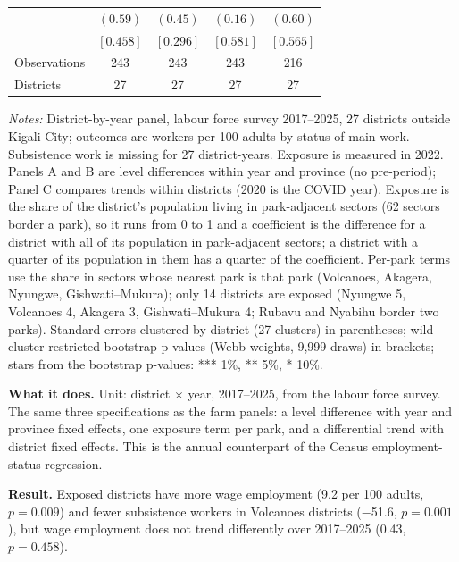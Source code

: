 \documentclass[11pt]{article}
\begin{document}
\begin{table}[H]
\begin{tabular}{lcccc}
 & $(0.59)$ & $(0.45)$ & $(0.16)$ & $(0.60)$ \\
 & $[0.458]$ & $[0.296]$ & $[0.581]$ & $[0.565]$ \\
\midrule
Observations & 243 & 243 & 243 & 216 \\
Districts & 27 & 27 & 27 & 27 \\
\bottomrule
\end{tabular}
\begin{minipage}{0.95\textwidth}\footnotesize
\textit{Notes:} District-by-year panel, labour force survey 2017--2025, 27 districts outside Kigali City; outcomes are workers per 100 adults by status of main work. Subsistence work is missing for 27 district-years. Exposure is measured in 2022. Panels A and B are level differences within year and province (no pre-period); Panel C compares trends within districts (2020 is the COVID year). Exposure is the share of the district's population living in park-adjacent sectors (62 sectors border a park), so it runs from 0 to 1 and a coefficient is the difference for a district with all of its population in park-adjacent sectors; a district with a quarter of its population in them has a quarter of the coefficient. Per-park terms use the share in sectors whose nearest park is that park (Volcanoes, Akagera, Nyungwe, Gishwati--Mukura); only 14 districts are exposed (Nyungwe 5, Volcanoes 4, Akagera 3, Gishwati--Mukura 4; Rubavu and Nyabihu border two parks). Standard errors clustered by district (27 clusters) in parentheses; wild cluster restricted bootstrap p-values (Webb weights, 9,999 draws) in brackets; stars from the bootstrap p-values: *** 1\%, ** 5\%, * 10\%.
\end{minipage}
\end{table}
\textbf{What it does.} Unit: district $\times$ year, 2017--2025, from the labour force survey. The same three specifications as the farm panels: a level difference with year and province fixed effects, one exposure term per park, and a differential trend with district fixed effects. This is the annual counterpart of the Census employment-status regression.

\textbf{Result.} Exposed districts have more wage employment (9.2 per 100 adults, $p=0.009$) and fewer subsistence workers in Volcanoes districts ($-$51.6, $p=0.001$), but wage employment does not trend differently over 2017--2025 (0.43, $p=0.458$).
\end{document}
